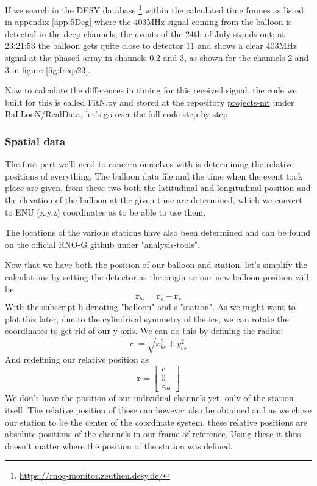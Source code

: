 If we search in the DESY database
\footnote{\url{https://rnog-monitor.zeuthen.desy.de/}} within the calculated
time frames as listed in appendix \ref{app:5Deg} where the 403MHz signal coming from the
balloon is detected in the deep channels, the events of the 24th of July stands
out; at 23:21:53 the balloon gets quite close to detector 11 and shows a clear
403MHz signal at the phased array in channels 0,2 and 3, as shown for the
channels 2 and 3 in figure \ref{fig:freqs23}.

Now to calculate the differences in timing for this received signal, the code
we built for this is called FitN.py and stored at the repository
\href{https://github.com/arthuradriaens-code/projects-mt.git}{projects-mt}
under BaLLooN/RealData, let's go over the full code step by step:
\subsubsection{Spatial data}
The first part we'll need to concern ourselves with is determining the relative
positions of everything. The balloon data file and the time when the event took
place are given, from these two both the latitudinal and longitudinal position
and the elevation of the balloon at the given time are determined, which we convert
to ENU (x,y,z) coordinates as to be able to use them. 

The locations of the various stations have also been determined and can be found 
on the official RNO-G github under "analysis-tools". 

Now that we have both the position of our balloon and station, 
let's simplify the calculations by setting the detector as the
origin i.e our new balloon position will be
\begin{equation}
  \mathbf{r}_{bs} = \mathbf{r}_b- \mathbf{r}_s
\end{equation}
With the subscript b denoting "balloon" and s "station".
As we might want to plot this later, due to the cylindrical symmetry of the
ice, we can rotate the coordinates to get rid of our y-axis. We can do
this by defining the radius:
\begin{equation}
  r := \sqrt{x_{bs}^2 + y_{bs}^2}
\end{equation}
And redefining our relative position as
\begin{equation}
  \mathbf{r} = 
  \begin{bmatrix}
  r \\
  0 \\
  z_{bs}
  \end{bmatrix}
\end{equation}
We don't have the position of our individual channels yet, only of the station
itself. The relative position of these can however also be obtained and as we
chose our station to be the center of the coordinate system, these relative
positions are absolute positions of the channels in our frame of reference.
Using these it thus doesn't matter where the position of the station was
defined.

